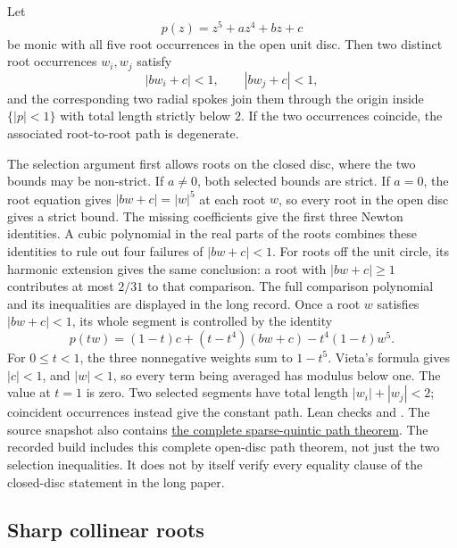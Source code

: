 \documentclass[11pt]{article}
\begin{document}
\begin{theorem}
\label{res:primitive-quintic}
Let
\[
  p(z)=z^5+az^4+bz+c
\]
be monic with all five root occurrences in the open unit disc.  Then two
distinct root occurrences $w_i,w_j$ satisfy
\[
  |bw_i+c|<1,
  \qquad
  |bw_j+c|<1,
\]
and the corresponding two radial spokes join them through the origin inside
$\{|p|<1\}$ with total length strictly below $2$.  If the two occurrences
coincide, the associated root-to-root path is degenerate.
\end{theorem}

\noindent The selection argument first allows roots on the closed disc,
where the two bounds may be non-strict. If $a\ne0$, both selected bounds are strict. If $a=0$, the root equation
gives $|bw+c|=|w|^5$ at each root $w$, so every root in the open disc gives
a strict bound.
The missing coefficients give the first three Newton identities. A cubic
polynomial in the real parts of the roots combines these identities to
rule out four failures of $|bw+c|<1$. For roots off the unit circle, its
harmonic extension gives the same conclusion: a root with $|bw+c|\ge1$
contributes at most $2/31$ to that comparison. The full comparison polynomial and its inequalities are displayed in the
long record. Once a root $w$ satisfies $|bw+c|<1$, its whole segment is
controlled by the identity
\[
 p(tw)=(1-t)c+(t-t^4)(bw+c)-t^4(1-t)w^5.
\]
For $0\le t<1$, the three nonnegative weights sum to $1-t^5$.
Vieta's formula gives $|c|<1$, and $|w|<1$, so every term being averaged
has modulus below one. The value at $t=1$ is zero. Two selected segments
have total length $|w_i|+|w_j|<2$; coincident occurrences instead give
the constant path.
Lean checks
and
.
The source snapshot also contains \href{https://github.com/wcook04/plectis-erdos/blob/3d6d938d696fed0fb71dd55115a18a73738ff223/lean/ErdosProblems/Erdos1041/PaperPrimitiveCompletionR10.lean#L235}{the complete sparse-quintic path theorem}.
The recorded build includes this complete open-disc path theorem, not just
the two selection inequalities. It does not by itself verify every equality
clause of the closed-disc statement in the long paper.

\subsection{Sharp collinear roots}\label{bdry:solved-polynomial-families}
\end{document}
